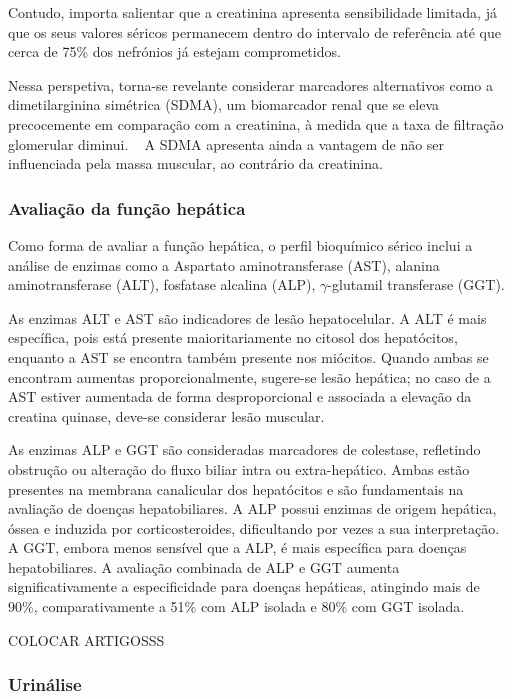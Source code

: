 Contudo, importa salientar que a creatinina apresenta sensibilidade limitada, já que os seus valores séricos permanecem dentro do intervalo de referência até que cerca de 75\% dos nefrónios já estejam comprometidos. ~\cite{Kovarikova2015}


Nessa perspetiva, torna-se revelante considerar marcadores alternativos como a dimetilarginina simétrica (SDMA), um biomarcador renal que se eleva precocemente em comparação com a creatinina, à medida que a taxa de filtração glomerular diminui. ~\cite{Gori2020} A SDMA apresenta ainda a vantagem de não ser influenciada pela massa muscular, ao contrário da creatinina. ~\cite{sdma}


\subsubsection{Avaliação da função hepática}


Como forma de avaliar a função hepática, o perfil bioquímico sérico inclui a análise de enzimas como a Aspartato aminotransferase (AST), alanina aminotransferase (ALT), fosfatase alcalina (ALP), $\gamma$-glutamil transferase (GGT). 


As enzimas ALT e AST são indicadores de lesão hepatocelular. A ALT é mais específica, pois está presente maioritariamente no citosol dos hepatócitos, enquanto a AST se encontra também presente nos miócitos. Quando ambas se encontram aumentas proporcionalmente, sugere-se lesão hepática; no caso de a AST estiver aumentada de forma desproporcional e associada a elevação da creatina quinase, deve-se considerar lesão muscular.


As enzimas ALP e GGT são consideradas marcadores de colestase, refletindo obstrução ou alteração do fluxo biliar intra ou extra-hepático. Ambas estão presentes na membrana canalicular dos hepatócitos e são fundamentais na avaliação de doenças hepatobiliares. A ALP possui enzimas de origem hepática, óssea e induzida por corticosteroides, dificultando por vezes a sua interpretação. A GGT, embora menos sensível que a ALP, é mais específica para doenças hepatobiliares. A avaliação combinada de ALP e GGT aumenta significativamente a especificidade para doenças hepáticas, atingindo mais de 90\%, comparativamente a 51\% com ALP isolada e 80\% com GGT isolada. 

COLOCAR ARTIGOSSS

\subsubsection{Urinálise}


